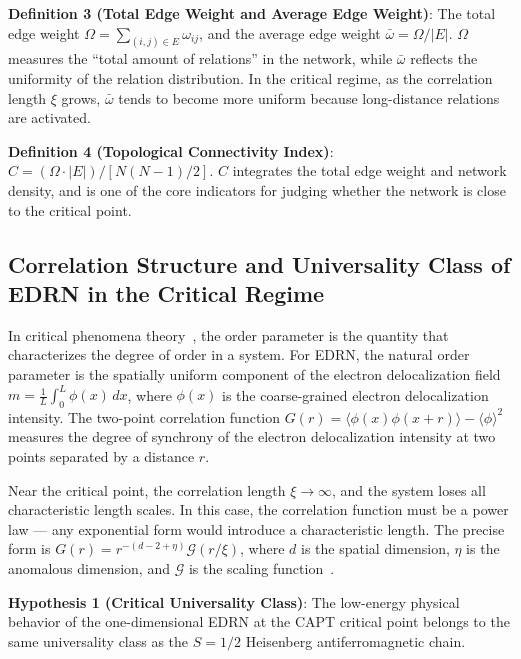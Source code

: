 \documentclass[prb,reprint,twocolumn,superscriptaddress]{revtex4-2}
\begin{document}
\textbf{Definition 3 (Total Edge Weight and Average Edge Weight)}: The total edge weight $\Omega = \sum_{(i,j)\in E} \omega_{ij}$, and the average edge weight $\bar{\omega} = \Omega / |E|$. $\Omega$ measures the ``total amount of relations'' in the network, while $\bar{\omega}$ reflects the uniformity of the relation distribution. In the critical regime, as the correlation length $\xi$ grows, $\bar{\omega}$ tends to become more uniform because long-distance relations are activated.

\textbf{Definition 4 (Topological Connectivity Index)}: $C = (\Omega \cdot |E|) / [N(N-1)/2]$. $C$ integrates the total edge weight and network density, and is one of the core indicators for judging whether the network is close to the critical point.

\subsection{Correlation Structure and Universality Class of EDRN in the Critical Regime}

In critical phenomena theory~\cite{Wilson1975,Fisher1967}, the order parameter is the quantity that characterizes the degree of order in a system. For EDRN, the natural order parameter is the spatially uniform component of the electron delocalization field $m = \frac{1}{L}\int_0^L \phi(x)\,dx$, where $\phi(x)$ is the coarse-grained electron delocalization intensity. The two-point correlation function $G(r) = \langle \phi(x)\phi(x+r) \rangle - \langle \phi \rangle^2$ measures the degree of synchrony of the electron delocalization intensity at two points separated by a distance $r$.

Near the critical point, the correlation length $\xi \to \infty$, and the system loses all characteristic length scales. In this case, the correlation function must be a power law --- any exponential form would introduce a characteristic length. The precise form is $G(r) = r^{-(d-2+\eta)} \mathcal{G}(r/\xi)$, where $d$ is the spatial dimension, $\eta$ is the anomalous dimension, and $\mathcal{G}$ is the scaling function~\cite{Wilson1975,Fisher1967}.

\textbf{Hypothesis 1 (Critical Universality Class)}: The low-energy physical behavior of the one-dimensional EDRN at the CAPT critical point belongs to the same universality class as the $S = 1/2$ Heisenberg antiferromagnetic chain.
\end{document}
